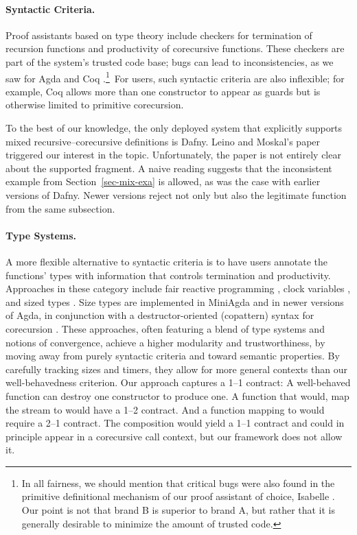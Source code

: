 \documentclass[preprint,draft]
{sigplanconf}
\newcommand{\<}{\langle}
\renewcommand{\>}{\rangle}
\begin{document}
\paragraph{Syntactic Criteria.}
Proof assistants based on type theory include checkers for termination of
recursion functions and productivity of corecursive functions. These checkers
are part of the system's trusted code base; bugs can lead to inconsistencies, as
we saw for Agda \cite{traytel-2014-agda} and Coq \cite{denes-2013-coqml}.\footnote{In all fairness, we should mention that critical bugs were also
found in the primitive definitional mechanism of our proof assistant of
choice, Isabelle \cite{kuncar-2015-cpp}. Our point is not that brand B is superior to brand A, but
rather that it is generally desirable to minimize the amount of trusted code.}
\,For users, such syntactic criteria are also inflexible; for example, Coq allows
more than one constructor to appear as guards but is otherwise limited to
primitive corecursion.

To the best of our knowledge, the only deployed system that explicitly supports mixed
recursive--corecursive definitions is Dafny. Leino and
Moskal's paper \cite{leino-moskal-2014} triggered our interest in the topic.
Unfortunately, the paper is not entirely clear about the supported fragment. A naive
reading suggests that the inconsistent  example from
Section~\ref{sec-mix-exa} is allowed, as was the case with earlier versions of
Dafny. Newer versions reject not only  but also the legitimate
 function from the same subsection.

\paragraph{Type Systems.}
A more flexible alternative to syntactic criteria is to have users annotate
the functions' types with information that controls termination and
productivity. Approaches in these category include
fair reactive programming \cite{fra1,usrp1,cave-et-al-2014},
clock variables \cite{mcbride-productive,clouston-et-al-2015}, and
sized types \cite{abel-2004}. Size types are implemented in
MiniAgda \cite{abel-2010-miniagda}
and in newer versions of Agda, in conjunction with a destructor-oriented
(copattern) syntax for corecursion \cite{abelP-2013}.
These approaches, often featuring a blend of type systems and notions of convergence, achieve a
higher modularity and trustworthiness, by moving away from purely syntactic
criteria and toward semantic properties.
By carefully tracking sizes and timers, they allow
for more general contexts than our well-behavedness criterion.
Our approach captures a 1--1 contract: A well-behaved
function can destroy one constructor to produce one. A function  that would,
map the stream  to  would have a 1--2
contract. And a function  mapping  to
 would require a 2--1 contract. The composition
 would yield a 1--1 contract and could in
principle appear in a corecursive call context, but our framework does not allow it.
\end{document}
